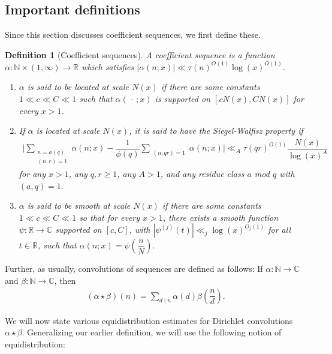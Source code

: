 \documentclass{amsart}
\newtheorem{defn}{Definition}
\numberwithin{equation}{section}
\begin{document}
\subsection{Important definitions}

Since this section discusses coefficient sequences, we first define these.

  

\begin{defn}[Coefficient sequences]\label{def:sequence}  A  coefficient sequence  is  a  function $\alpha: \mathbb{N} \times (1, \infty) \rightarrow \mathbb{R}$ which satisfies $|\alpha(n;x)| \ll \tau(n)^{O(1)}\log(x)^{O(1)}$. 
\begin{enumerate}[{\rm (i)}]
\item $\alpha$ is said to be located at scale $N(x)$ if there are some constants $1 \ll c \ll C \ll 1$ such that   $\alpha(\,\cdot\,;x)$ is supported on $[cN(x),CN(x)]$ for every $x>1$.
\item If $\alpha$ is located at scale $N(x)$, it is said to have the Siegel-Walfisz property if 
\begin{align*}
\Bigg| \sum_{\substack{n=a (q) \\ (n,r)=1 }} \alpha(n;x)  -\dfrac{1}{\phi(q)}\sum_{\substack{ (n,qr)=1 }} \alpha(n;x) \Bigg| \ll_A \tau(qr)^{O(1)}\dfrac{ N(x) }{\log(x)^{A}}
\end{align*}
for any $x>1$, any $q, r \geq 1$, any $A >1$, and any  residue class $a$ mod $q$ with $(a,q)=1$. 
\item $\alpha$ is said to be  smooth at scale $N(x)$ if there are some constants $1\ll c \ll C \ll 1$ so that for every $x>1$, there exists  a  smooth function $\psi:\mathbb{R} \rightarrow \mathbb{C}$ supported on $[c,C]$, with $|\psi^{(j)}(t)| \ll_j \log(x)^{O_j(1)}$ for all $t \in \mathbb{R}$, such that 
$
\alpha(n;x) = \psi\left(\dfrac{n}{N}\right).
$
\end{enumerate}
\end{defn}

Further, as usually,    convolutions of sequences are defined as follows: If $\alpha: \mathbb{N} \rightarrow \mathbb{C}$ and $\beta: \mathbb{N} \rightarrow \mathbb{C}$, then
\begin{align*}
(\alpha \star \beta)(n) = \sum_{d \mid n} \alpha(d) \beta\left(\dfrac{n}{d}\right).
\end{align*}

We will now state various equidistribution estimates for Dirichlet convolutions $\alpha\star \beta$. Generalizing our earlier definition, we will use the following notion of equidistribution:
\end{document}
